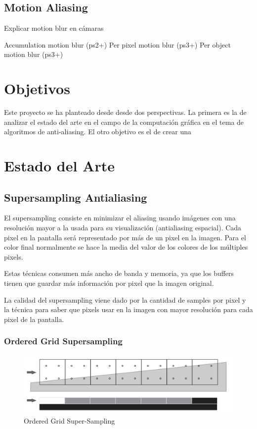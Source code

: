 \documentclass[withindex, glossary]{cam-thesis}
\begin{document}
\section{Motion Aliasing}
Explicar motion blur en cámaras

Accumulation motion blur (ps2+)
Per pixel motion blur (ps3+)
Per object motion blur (ps3+)

\chapter{Objetivos}
Este proyecto se ha planteado desde desde dos perspectivas. La primera es la de analizar el estado del arte en el campo de la computación gráfica en el tema de algoritmos de anti-aliasing. El otro objetivo es el de crear una 
\chapter{Estado del Arte}

\section{Supersampling Antialiasing}

El supersampling consiste en minimizar el aliasing usando imágenes con una resolución mayor a la usada para su visualización (antialiasing espacial). Cada pixel en la pantalla será representado por más de un pixel en la imagen. Para el color final normalmente se hace la media del valor de los colores de los múltiples pixels.

Estas técnicas consumen más ancho de banda y memoria, ya que los buffers tienen que guardar más información por pixel que la imagen original.

La calidad del supersampling viene dado por la cantidad de samples por pixel y la técnica para saber que pixels usar en la imagen con mayor resolución para cada pixel de la pantalla.


\subsection{Ordered Grid Supersampling}

\begin{figure}
    \includegraphics[width=\linewidth]{figures/ogss.png}
    \caption{Ordered Grid Super-Sampling\cite{Beets2000SupersamplingAA}}
\end{figure}
\end{document}
